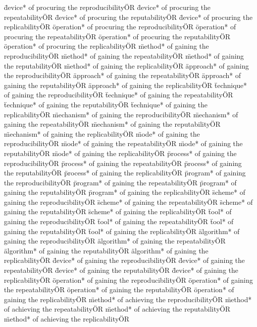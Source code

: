\documentclass[
10pt, %
a4paper, %
oneside, %
headinclude,footinclude, %
BCOR5mm, %
]{scrartcl}
\begin{document}
\"device* of procuring the reproducibility\" OR \"device* of procuring the repeatability\" OR \"device* of procuring the reputability\" OR \"device* of procuring the replicability\" OR 
\"operation* of procuring the reproducibility\" OR \"operation* of procuring the repeatability\" OR \"operation* of procuring the reputability\" OR \"operation* of procuring the replicability\" OR 
\"method* of gaining the reproducibility\" OR \"method* of gaining the repeatability\" OR \"method* of gaining the reputability\" OR \"method* of gaining the replicability\" OR 
\"approach* of gaining the reproducibility\" OR \"approach* of gaining the repeatability\" OR \"approach* of gaining the reputability\" OR \"approach* of gaining the replicability\" OR 
\"technique* of gaining the reproducibility\" OR \"technique* of gaining the repeatability\" OR \"technique* of gaining the reputability\" OR \"technique* of gaining the replicability\" OR 
\"mechanism* of gaining the reproducibility\" OR \"mechanism* of gaining the repeatability\" OR \"mechanism* of gaining the reputability\" OR \"mechanism* of gaining the replicability\" OR 
\"mode* of gaining the reproducibility\" OR \"mode* of gaining the repeatability\" OR \"mode* of gaining the reputability\" OR \"mode* of gaining the replicability\" OR 
\"process* of gaining the reproducibility\" OR \"process* of gaining the repeatability\" OR \"process* of gaining the reputability\" OR \"process* of gaining the replicability\" OR 
\"program* of gaining the reproducibility\" OR \"program* of gaining the repeatability\" OR \"program* of gaining the reputability\" OR \"program* of gaining the replicability\" OR 
\"scheme* of gaining the reproducibility\" OR \"scheme* of gaining the repeatability\" OR \"scheme* of gaining the reputability\" OR \"scheme* of gaining the replicability\" OR 
\"tool* of gaining the reproducibility\" OR \"tool* of gaining the repeatability\" OR \"tool* of gaining the reputability\" OR \"tool* of gaining the replicability\" OR 
\"algorithm* of gaining the reproducibility\" OR \"algorithm* of gaining the repeatability\" OR \"algorithm* of gaining the reputability\" OR \"algorithm* of gaining the replicability\" OR 
\"device* of gaining the reproducibility\" OR \"device* of gaining the repeatability\" OR \"device* of gaining the reputability\" OR \"device* of gaining the replicability\" OR 
\"operation* of gaining the reproducibility\" OR \"operation* of gaining the repeatability\" OR \"operation* of gaining the reputability\" OR \"operation* of gaining the replicability\" OR 
\"method* of achieving the reproducibility\" OR \"method* of achieving the repeatability\" OR \"method* of achieving the reputability\" OR \"method* of achieving the replicability\" OR 
\end{document}
